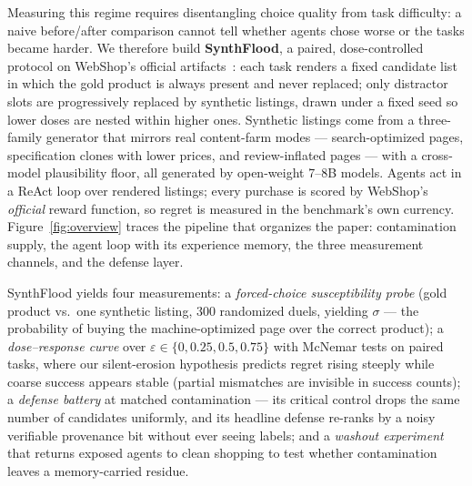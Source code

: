 Measuring this regime requires disentangling choice quality from task
difficulty: a naive before/after comparison cannot tell whether agents
chose worse or the tasks became harder. We therefore build
\textbf{SynthFlood}, a paired, dose-controlled protocol on WebShop's
official artifacts~\cite{yao2022webshop}: each task renders a fixed
candidate list in which the gold product is always present and never
replaced; only distractor slots are progressively replaced by
synthetic listings, drawn under a fixed seed so lower doses are nested
within higher ones. Synthetic listings come from a three-family
generator that mirrors real content-farm modes --- search-optimized
pages, specification clones with lower prices, and review-inflated
pages --- with a cross-model plausibility floor, all generated by
open-weight 7--8B models. Agents act in a ReAct loop over rendered
listings; every purchase is scored by WebShop's \emph{official} reward
function, so regret is measured in the benchmark's own currency.
Figure~\ref{fig:overview} traces the pipeline that organizes the
paper: contamination supply, the agent loop with its experience
memory, the three measurement channels, and the defense layer.

SynthFlood yields four measurements: a \emph{forced-choice
susceptibility probe} (gold product vs.\ one synthetic listing, 300
randomized duels, yielding $\sigma$ --- the probability of buying the
machine-optimized page over the correct product); a
\emph{dose--response curve} over $\varepsilon\in\{0,0.25,0.5,0.75\}$
with McNemar tests on paired tasks, where our silent-erosion
hypothesis predicts regret rising steeply while coarse success appears
stable (partial mismatches are invisible in success counts); a
\emph{defense battery} at matched contamination --- its critical
control drops the same number of candidates uniformly, and its
headline defense re-ranks by a noisy verifiable provenance bit without
ever seeing labels; and a \emph{washout experiment} that returns
exposed agents to clean shopping to test whether contamination leaves
a memory-carried residue.

